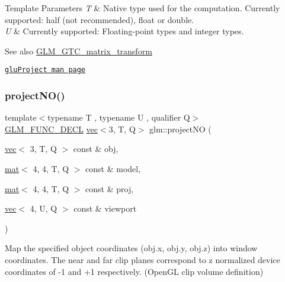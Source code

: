 \begin{DoxyTemplParams}{Template Parameters}
{\em T} & Native type used for the computation. Currently supported\+: half (not recommended), float or double. \\
\hline
{\em U} & Currently supported\+: Floating-\/point types and integer types. \\
\hline
\end{DoxyTemplParams}
\begin{DoxySeeAlso}{See also}
\hyperlink{group__gtc__matrix__transform}{G\+L\+M\+\_\+\+G\+T\+C\+\_\+matrix\+\_\+transform} 

\href{https://www.khronos.org/registry/OpenGL-Refpages/gl2.1/xhtml/gluProject.xml}{\tt glu\+Project man page} 
\end{DoxySeeAlso}
\mbox{\label{group__gtc__matrix__transform_ga05249751f48d14cb282e4979802b8111}} 
\subsubsection{\texorpdfstring{project\+N\+O()}{projectNO()}}
{\footnotesize\ttfamily template$<$typename T , typename U , qualifier Q$>$ \\
\hyperlink{setup_8hpp_ab2d052de21a70539923e9bcbf6e83a51}{G\+L\+M\+\_\+\+F\+U\+N\+C\+\_\+\+D\+E\+CL} \hyperlink{structglm_1_1vec}{vec}$<$3, T, Q$>$ glm\+::project\+NO (\begin{DoxyParamCaption}\item[{\hyperlink{structglm_1_1vec}{vec}$<$ 3, T, Q $>$ const \&}]{obj,  }\item[{\hyperlink{structglm_1_1mat}{mat}$<$ 4, 4, T, Q $>$ const \&}]{model,  }\item[{\hyperlink{structglm_1_1mat}{mat}$<$ 4, 4, T, Q $>$ const \&}]{proj,  }\item[{\hyperlink{structglm_1_1vec}{vec}$<$ 4, U, Q $>$ const \&}]{viewport }\end{DoxyParamCaption})}

Map the specified object coordinates (obj.\+x, obj.\+y, obj.\+z) into window coordinates. The near and far clip planes correspond to z normalized device coordinates of -\/1 and +1 respectively. (Open\+GL clip volume definition)


